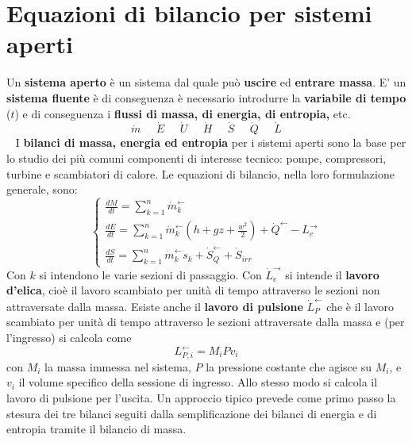 \section{Equazioni di bilancio per sistemi aperti}
Un \textbf{sistema aperto} è un sistema dal quale può \textbf{uscire} ed \textbf{entrare massa}.\newline
\newline
E' un \textbf{sistema fluente} è di conseguenza è necessario introdurre la \textbf{variabile di tempo} ($t$) e di conseguenza i \textbf{flussi di massa, di energia, di entropia,} etc.
\[
    \dot{m} \;\;\;\;\; \dot{E}\;\;\;\;\; \dot{U} \;\;\;\;\; \dot{H} \;\;\;\;\; \dot{S} \;\;\;\;\; \dot{Q} \;\;\;\;\; \dot{L}
\]
\ \newline
I \textbf{bilanci di massa, energia ed entropia} per i sistemi aperti sono la base per lo studio dei più
comuni componenti di interesse tecnico: pompe, compressori, turbine e scambiatori di calore. \newline
\newline
Le equazioni di bilancio, nella loro formulazione generale, sono:
\[
    \begin{cases}
        \frac{dM}{dt} = \sum_{k=1}^{n}\dot{m}_k^\leftarrow \\
        \frac{dE}{dt} = \sum_{k=1}^{n}\dot{m}_k^\leftarrow  \left(h + gz + \frac{w^2}{2}\right) + \dot{Q}^\leftarrow  - L_e^\rightarrow \\
        \frac{dS}{dt} = \sum_{k=1}^{n} \dot{m}_k^\leftarrow  s_k + \dot{S}_Q^\leftarrow + \dot{S}_{irr}
    \end{cases}
\]
Con $k$ si intendono le varie sezioni di passaggio.\newline
Con $\dot{L}_e^\rightarrow $ si intende il \textbf{lavoro d'elica}, cioè il lavoro scambiato per unità di tempo attraverso le sezioni non attraversate dalla massa.\newline 
Esiste anche il \textbf{lavoro di pulsione} $\dot{L}_P^\leftarrow $ che è il lavoro scambiato per unità di tempo attraverso le sezioni attraversate dalla massa e (per l'ingresso) si calcola come
\[
    L_{P,i}^\leftarrow  = M_i P v_i
\]
con $M_i$ la massa immessa nel sistema, $P$ la pressione costante che agisce su $M_i$, e $v_i$ il volume specifico della sessione di ingresso. Allo stesso modo si calcola il lavoro di pulsione per l'uscita.\newline
\newline
Un approccio tipico prevede come primo passo la stesura dei tre bilanci seguiti dalla semplificazione dei bilanci di energia e di entropia tramite il bilancio di massa.
